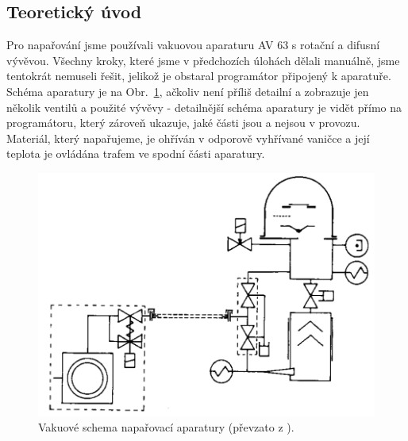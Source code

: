 \documentclass[english]{article}
\begin{document}
    \subsection{Teoretický úvod}
    	Pro napařování jsme používali vakuovou aparaturu AV 63 s rotační a difusní vývěvou. Všechny kroky, které jsme v předchozích úlohách dělali manuálně, jsme tentokrát nemuseli řešit, jelikož je obstaral programátor připojený k aparatuře. Schéma aparatury je na Obr.~\ref{fig:s_aparatura}, ačkoliv není příliš detailní a zobrazuje jen několik ventilů a použité vývěvy - detailnější schéma aparatury je vidět přímo na programátoru, který zároveň ukazuje, jaké části jsou a nejsou v provozu. Materiál, který napařujeme, je ohříván v odporově vyhřívané vaničce a její teplota je ovládána trafem ve spodní části aparatury. \newpage
    	
    		
    				\begin{figure}[h!]
    					\begin{center}
    						\includegraphics[width=0.55\linewidth]{../att/schema.png}
    						\caption{Vakuové schema napařovací aparatury (převzato z \cite{bib:praskripta}). }
    						\label{fig:s_aparatura}
    					\end{center}
    				\end{figure}
    	
\end{document}
